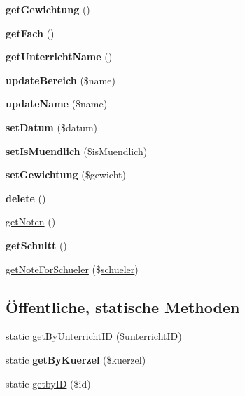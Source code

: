 \begin{DoxyCompactItemize}
{\bfseries get\+Gewichtung} ()
\item 
\mbox{\label{class_note_arbeit_a5bf781ed5aeedb12b955ff6840f96c6f}} 
{\bfseries get\+Fach} ()
\item 
\mbox{\label{class_note_arbeit_a73d5601b2b64a69163758d2a33c1ffa0}} 
{\bfseries get\+Unterricht\+Name} ()
\item 
\mbox{\label{class_note_arbeit_a4c80dd376ec1ab7458075693678b7bff}} 
{\bfseries update\+Bereich} (\$name)
\item 
\mbox{\label{class_note_arbeit_a02e7ec0060ab458cf651dc09f8b63766}} 
{\bfseries update\+Name} (\$name)
\item 
\mbox{\label{class_note_arbeit_a0ad520f97e7e1b90a7b2b3d023bbca3f}} 
{\bfseries set\+Datum} (\$datum)
\item 
\mbox{\label{class_note_arbeit_a08918cd3292e72bbf79679aa5cbc2668}} 
{\bfseries set\+Is\+Muendlich} (\$is\+Muendlich)
\item 
\mbox{\label{class_note_arbeit_a33e37519ae509d16e69a84db986597c9}} 
{\bfseries set\+Gewichtung} (\$gewicht)
\item 
\mbox{\label{class_note_arbeit_a95209cbed2034d2ed3844f03aa97cbad}} 
{\bfseries delete} ()
\item 
\mbox{\hyperlink{class_note_arbeit_a5919248c301727a1b711090b67f00a8a}{get\+Noten}} ()
\item 
\mbox{\label{class_note_arbeit_adda223bc1d810e6523a4785e85b8b81a}} 
{\bfseries get\+Schnitt} ()
\item 
\mbox{\hyperlink{class_note_arbeit_ae55999ef8b3cfd611af1bbd07142cb4f}{get\+Note\+For\+Schueler}} (\$\mbox{\hyperlink{classschueler}{schueler}})
\end{DoxyCompactItemize}
\subsection*{Öffentliche, statische Methoden}
\begin{DoxyCompactItemize}
\item 
static \mbox{\hyperlink{class_note_arbeit_a592f3057d39d92ffc02791881b2d87f8}{get\+By\+Unterricht\+ID}} (\$unterricht\+ID)
\item 
\mbox{\label{class_note_arbeit_a0dd7ef1e403eb39e5dbc5ee187d00528}} 
static {\bfseries get\+By\+Kuerzel} (\$kuerzel)
\item 
static \mbox{\hyperlink{class_note_arbeit_a6f8d348f0e7a13abc8b30d9c79f3422a}{getby\+ID}} (\$id)
\end{DoxyCompactItemize}



